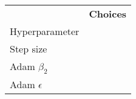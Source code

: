 \begin{tabular}{ll}
 & \bfseries Choices \\
Hyperparameter &  \\
Step size &  \\
Adam $\beta_2$ &  \\
Adam $\epsilon$ &  \\
\end{tabular}
